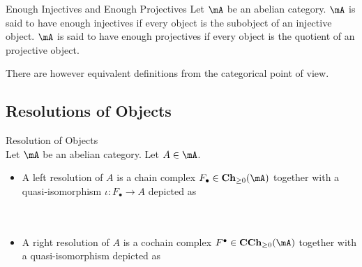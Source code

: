\documentclass[a4paper]{article}
\begin{document}
\begin{defn}{Enough Injectives and Enough Projectives}{} Let $\mA$ be an abelian category. $\mA$ is said to have enough injectives if every object is the subobject of an injective object. $\mA$ is said to have enough projectives if every object is the quotient of an projective object. 
\end{defn}

There are however equivalent definitions from the categorical point of view. 

\subsection{Resolutions of Objects}
\begin{defn}{Resolution of Objects}{}\\
Let $\mA$ be an abelian category. Let $A\in\mA$. 
\begin{itemize}
\item A left resolution of $A$ is a chain complex $F_\bullet\in\bold{Ch}_{\geq 0}(\mA)$ together with a quasi-isomorphism $\iota:F_\bullet\to A$ depicted as \\~\\
\\
\item A right resolution of $A$ is a cochain complex $F^\bullet\in\bold{CCh}_{\geq 0}(\mA)$ together with a quasi-isomorphism depicted as \\~\\
\\
\end{itemize}
\end{defn}
\end{document}
